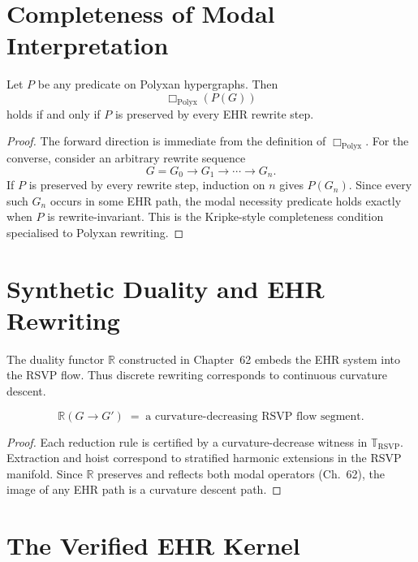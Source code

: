 \section{Completeness of Modal Interpretation}

\begin{theorem}
\label{thm:67-complete}
Let $P$ be any predicate on Polyxan hypergraphs.  
Then
\[
\Box_{\mathrm{Polyx}}(P(G))
\]
holds if and only if $P$ is preserved by every EHR rewrite step.
\end{theorem}

\begin{proof}
The forward direction is immediate from the definition of $\Box_{\mathrm{Polyx}}$.  
For the converse, consider an arbitrary rewrite sequence
\[
G = G_0 \to G_1 \to \cdots \to G_n.
\]
If $P$ is preserved by every rewrite step, induction on $n$ gives $P(G_n)$.  
Since every such $G_n$ occurs in some EHR path, the modal necessity predicate 
holds exactly when $P$ is rewrite-invariant.  
This is the Kripke-style completeness condition specialised to Polyxan 
rewriting.
\end{proof}

\section{Synthetic Duality and EHR Rewriting}

The duality functor $\mathbb{R}$ constructed in Chapter~62 embeds the EHR 
system into the RSVP flow.  
Thus discrete rewriting corresponds to continuous curvature descent.

\begin{theorem}
\[
\mathbb{R}(G \to G') \;=\; 
\text{a curvature-decreasing RSVP flow segment}.
\]
\end{theorem}

\begin{proof}
Each reduction rule is certified by a curvature-decrease witness in 
$\mathbb{T}_{\mathrm{RSVP}}$.  
Extraction and hoist correspond to stratified harmonic extensions in the RSVP 
manifold.  
Since $\mathbb{R}$ preserves and reflects both modal operators (Ch.~62), the 
image of any EHR path is a curvature descent path.
\end{proof}

\section{The Verified EHR Kernel}

